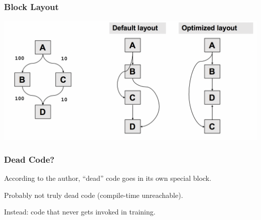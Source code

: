 \begin{frame}
\frametitle{Block Layout}

\begin{center}
	\includegraphics[width=\textwidth]{images/blocklayout.png}
\end{center}

\end{frame}



\begin{frame}
\frametitle{Dead Code?}

\large
\begin{changemargin}{1cm}
According to the author, ``dead'' code goes in its own special block. 

Probably not truly dead code (compile-time unreachable).

Instead: code that never gets invoked in training.
\end{changemargin}

\end{frame}




